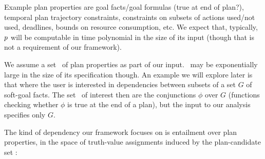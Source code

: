 Example plan properties are goal facts/goal formulas (true at end of
plan?), temporal plan trajectory constraints, constraints on subsets
of actions used/not used, deadlines, bounds on resource consumption,
etc. We expect that, typically, $p$ will be computable in time
polynomial in the size of its input (though that is not a requirement
of our framework).

We assume a set \props\ of plan properties as part of our
input. \props\ may be exponentially large in the size of its
specification though. An example we will explore later is that where
the user is interested in dependencies between subsets of a set $G$ of
soft-goal facts. The set \props\ of interest then are the conjunctions
$\phi$ over $G$ (functions checking whether $\phi$ is true at the end
of a plan), but the input to our analysis specifies only $G$.
%
%
%

The kind of dependency our framework focuses on is entailment over
plan properties, in the space of truth-value assignments induced by
the plan-candidate set \plans:


